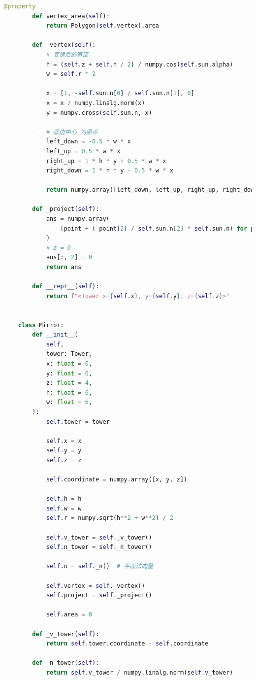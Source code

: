 \documentclass[withoutpreface,bwprint]{cumcmthesis} %
\begin{document}
\begin{appendices}
\begin{lstlisting}[language=python]
        @property
        def vertex_area(self):
            return Polygon(self.vertex).area
    
        def _vertex(self):
            # 变换后的宽高
            h = (self.z + self.h / 2) / numpy.cos(self.sun.alpha)
            w = self.r * 2
    
            x = [1, -self.sun.n[0] / self.sun.n[1], 0]
            x = x / numpy.linalg.norm(x)
            y = numpy.cross(self.sun.n, x)
    
            # 底边中心 为原点
            left_down = -0.5 * w * x
            left_up = 0.5 * w * x
            right_up = 1 * h * y + 0.5 * w * x
            right_down = 1 * h * y - 0.5 * w * x
    
            return numpy.array([left_down, left_up, right_up, right_down])
    
        def _project(self):
            ans = numpy.array(
                [point + (-point[2] / self.sun.n[2] * self.sun.n) for point in self.vertex]
            )
            # z = 0
            ans[:, 2] = 0
            return ans
    
        def __repr__(self):
            return f"<Tower x={self.x}, y={self.y}, z={self.z}>"
    
    
    class Mirror:
        def __init__(
            self,
            tower: Tower,
            x: float = 0,
            y: float = 0,
            z: float = 4,
            h: float = 6,
            w: float = 6,
        ):
            self.tower = tower
    
            self.x = x
            self.y = y
            self.z = z
    
            self.coordinate = numpy.array([x, y, z])
    
            self.h = h
            self.w = w
            self.r = numpy.sqrt(h**2 + w**2) / 2
    
            self.v_tower = self._v_tower()
            self.n_tower = self._n_tower()
    
            self.n = self._n()  # 平面法向量
    
            self.vertex = self._vertex()
            self.project = self._project()
    
            self.area = 0
    
        def _v_tower(self):
            return self.tower.coordinate - self.coordinate
    
        def _n_tower(self):
            return self.v_tower / numpy.linalg.norm(self.v_tower)
    

\end{lstlisting}
\end{appendices}
\end{document}
